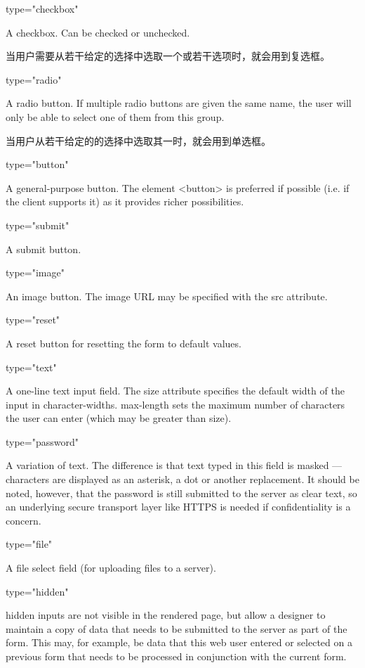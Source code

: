 \begin{compactitem}
\item  type="checkbox"

A checkbox. Can be checked or unchecked.

当用户需要从若干给定的选择中选取一个或若干选项时，就会用到复选框。

\item type="radio"

A radio button. If multiple radio buttons are given the same name, the user will only be able to select one of them from this group.

当用户从若干给定的的选择中选取其一时，就会用到单选框。

 \item type="button"

A general-purpose button. The element <button> is preferred if possible (i.e. if the client supports it) as it provides richer possibilities.

\item  type="submit"

A submit button.

 \item type="image"

An image button. The image URL may be specified with the src attribute.

 \item type="reset"

A reset button for resetting the form to default values.

 \item type="text"

A one-line text input field. The size attribute specifies the default width of the input in character-widths. max-length sets the maximum number of characters the user can enter (which may be greater than size).

 \item type="password"

A variation of text. The difference is that text typed in this field is masked — characters are displayed as an asterisk, a dot or another replacement. It should be noted, however, that the password is still submitted to the server as clear text, so an underlying secure transport layer like HTTPS is needed if confidentiality is a concern.

 \item type="file"

A file select field (for uploading files to a server).

 \item type="hidden"

hidden inputs are not visible in the rendered page, but allow a designer to maintain a copy of data that needs to be submitted to the server as part of the form. This may, for example, be data that this web user entered or selected on a previous form that needs to be processed in conjunction with the current form.


\end{compactitem}


